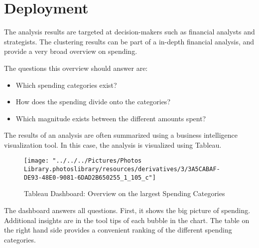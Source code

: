 
\chapter{Deployment}
	The analysis results are targeted at decision-makers such as financial analysts and strategists. The clustering results can be part of a in-depth financial analysis, and provide a very broad overview on spending.
	
	The questions this overview should answer are:
	\begin{itemize}
		\item Which spending categories exist?
		\item How does the spending divide onto the categories?
		\item Which magnitude exists between the different amounts spent?
	\end{itemize}
	
	The results of an analysis are often summarized using a business intelligence visualization tool. In this case, the analysis is visualized using Tableau.
\begin{figure}[h!]
	\centering
	\texttt{[image: "../../../Pictures/Photos Library.photoslibrary/resources/derivatives/3/3A5CABAF-DE93-48E0-9081-6DAD2B650255\_1\_105\_c"]}
	\caption{Tableau Dashboard: Overview on the largest Spending Categories}
	
\end{figure}

	The dashboard answers all questions. First, it shows the big picture of spending. Additional insights are in the tool tips of each bubble in the chart. The table on the right hand side provides a convenient ranking of the different spending categories.
	
